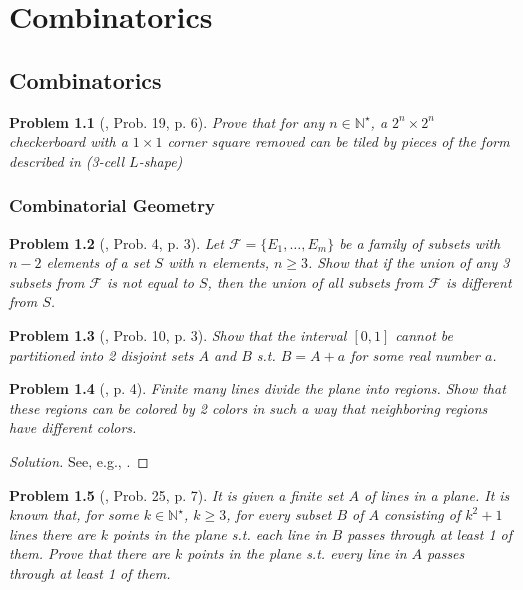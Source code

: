 \documentclass[oneside]{book}
\numberwithin{equation}{section}
\newtheorem{problem}{Problem}[section]
\begin{document}

\part{Combinatorics}

\chapter{Combinatorics}

\begin{problem}[\cite{Gelca_Andreescu2017}, Prob. 19, p. 6]
	Prove that for any $n\in\mathbb{N}^\star$, a $2^n\times 2^n$ checkerboard with a $1\times 1$ corner square removed can be tiled by pieces of the form described in \cite[Fig. 2, p. 6]{Gelca_Andreescu2017} (3-cell $L$-shape)
\end{problem}

\section{Combinatorial Geometry}

\begin{problem}[\cite{Gelca_Andreescu2017}, Prob. 4, p. 3]
	Let $\mathcal{F} = \{E_1,\ldots,E_m\}$ be a family of subsets with $n - 2$ elements of a set $S$ with $n$ elements, $n\ge 3$. Show that if the union of any 3 subsets from $\mathcal{F}$ is not equal to $S$, then the union of all subsets from $\mathcal{F}$ is different from $S$.
\end{problem}

\begin{problem}[\cite{Gelca_Andreescu2017}, Prob. 10, p. 3]
	Show that the interval $[0,1]$ cannot be partitioned into 2 disjoint sets $A$ and $B$ s.t. $B = A + a$ for some real number $a$.
\end{problem}

\begin{problem}[\cite{Gelca_Andreescu2017}, p. 4]
	Finite many lines divide the plane into regions. Show that these regions can be colored by 2 colors in such a way that neighboring regions have different colors.
\end{problem}

\begin{proof}[Solution]
	See, e.g., \cite[p. 4]{Gelca_Andreescu2017}.
\end{proof}

\begin{problem}[\cite{Gelca_Andreescu2017}, Prob. 25, p. 7]
	It is given a finite set $A$ of lines in a plane. It is known that, for some $k\in\mathbb{N}^\star$, $k\ge 3$, for every subset $B$ of $A$ consisting of $k^2 + 1$ lines there are $k$ points in the plane s.t. each line in $B$ passes through at least 1 of them. Prove that there are $k$ points in the plane s.t. every line in $A$ passes through at least 1 of them.
\end{problem}
\end{document}
